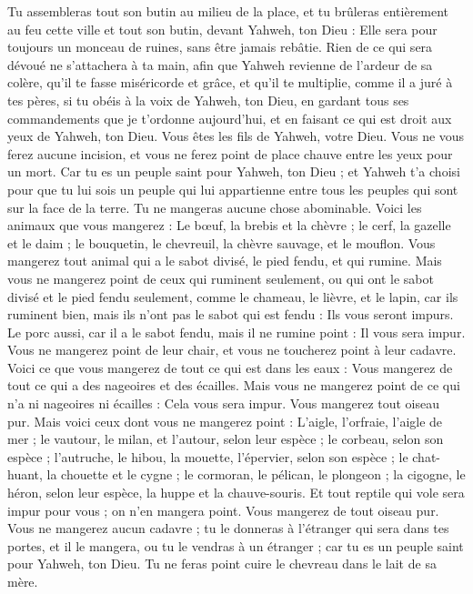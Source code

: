\begin{multicols}{2}
Tu assembleras tout son butin au milieu de la place, et tu brûleras entièrement au feu cette ville et tout son butin, devant Yahweh, ton Dieu : Elle sera pour toujours un monceau de ruines, sans être jamais rebâtie.
Rien de ce qui sera dévoué ne s’attachera à ta main, afin que Yahweh revienne de l’ardeur de sa colère, qu'il te fasse miséricorde et grâce, et qu'il te multiplie, comme il a juré à tes pères,
si tu obéis à la voix de Yahweh, ton Dieu, en gardant tous ses commandements que je t’ordonne aujourd'hui, et en faisant ce qui est droit aux yeux de Yahweh, ton Dieu.
\VerseOne{}Vous êtes les fils de Yahweh, votre Dieu. Vous ne vous ferez aucune incision, et vous ne ferez point de place chauve entre les yeux pour un mort.
Car tu es un peuple saint pour Yahweh, ton Dieu ; et Yahweh t'a choisi pour que tu lui sois un peuple qui lui appartienne entre tous les peuples qui sont sur la face de la terre.
Tu ne mangeras aucune chose abominable.
Voici les animaux que vous mangerez : Le bœuf, la brebis et la chèvre ;
le cerf, la gazelle et le daim ; le bouquetin, le chevreuil, la chèvre sauvage, et le mouflon.
Vous mangerez tout animal qui a le sabot divisé, le pied fendu, et qui rumine.
Mais vous ne mangerez point de ceux qui ruminent seulement, ou qui ont le sabot divisé et le pied fendu seulement, comme le chameau, le lièvre, et le lapin, car ils ruminent bien, mais ils n'ont pas le sabot qui est fendu : Ils vous seront impurs.
Le porc aussi, car il a le sabot fendu, mais il ne rumine point : Il vous sera impur. Vous ne mangerez point de leur chair, et vous ne toucherez point à leur cadavre.
Voici ce que vous mangerez de tout ce qui est dans les eaux : Vous mangerez de tout ce qui a des nageoires et des écailles.
Mais vous ne mangerez point de ce qui n'a ni nageoires ni écailles : Cela vous sera impur.
Vous mangerez tout oiseau pur.
Mais voici ceux dont vous ne mangerez point : L'aigle, l'orfraie, l’aigle de mer ;
le vautour, le milan, et l'autour, selon leur espèce ;
le corbeau, selon son espèce ;
l’autruche, le hibou, la mouette, l’épervier, selon son espèce ;
le chat-huant, la chouette et le cygne ;
le cormoran, le pélican, le plongeon ;
la cigogne, le héron, selon leur espèce, la huppe et la chauve-souris.
Et tout reptile qui vole sera impur pour vous ; on n'en mangera point.
Vous mangerez de tout oiseau pur.
Vous ne mangerez aucun cadavre ; tu le donneras à l'étranger qui sera dans tes portes, et il le mangera, ou tu le vendras à un étranger ; car tu es un peuple saint pour Yahweh, ton Dieu. Tu ne feras point cuire le chevreau dans le lait de sa mère.

\end{multicols}
